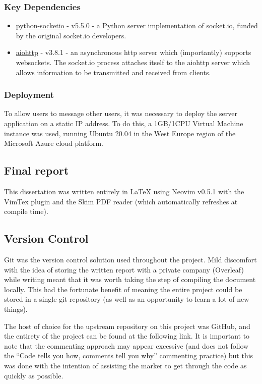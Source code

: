 \documentclass{mproj}
\begin{document}
\subsubsection{Key Dependencies}
\begin{itemize}
	\item \href{https://python-socketio.readthedocs.io/en/latest/index.html}{python-socketio} - v5.5.0 - a Python server implementation of socket.io, funded by the original socket.io developers.
	\item \href{https://docs.aiohttp.org/en/stable/}{aiohttp} - v3.8.1 - an asynchronous http server which (importantly) supports websockets. The socket.io process attaches itself to the aiohttp server which allows information to be transmitted and received from clients.
\end{itemize}

\subsubsection{Deployment}
To allow users to message other users, it was necessary to deploy the server application on a static IP address. To do this, a 1GB/1CPU Virtual Machine instance was used, running Ubuntu 20.04 in the West Europe region of the Microsoft Azure cloud platform. 

\subsection{Final report}
This dissertation was written entirely in LaTeX using Neovim v0.5.1 with the VimTex plugin and the Skim PDF reader (which automatically refreshes at compile time). 

\subsection{Version Control}
Git was the version control solution used throughout the project. Mild discomfort with the idea of storing the written report with a private company (Overleaf) while writing meant that it was worth taking the step of compiling the document locally. This had the fortunate benefit of meaning the entire project could be stored in a single git repository (as well as an opportunity to learn a lot of new things). 

The host of choice for the upstream repository on this project was GitHub, and the entirety of the project can be found at the following link. It is important to note that the commenting approach may appear excessive (and does not follow the ``Code tells you how, comments tell you why'' commenting practice) but this was done with the intention of assisting the marker to get through the code as quickly as possible.  
\end{document}
